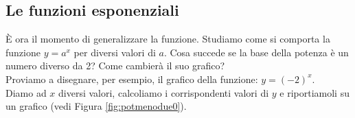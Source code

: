 \subsection{Le funzioni esponenziali}
\label{subsec:esplog_fesponenziale}

È ora il momento di generalizzare la funzione. 
Studiamo come si comporta la funzione \(y=a^x\) per diversi valori di \(a\).
Cosa succede se la base della potenza è un numero diverso da 2? 
Come cambierà il suo grafico?\\[10pt]
\; Proviamo a disegnare, per esempio, il grafico della 
funzione: \(y=(-2)^x\).\\[4pt]
Diamo ad \(x\) diversi valori, calcoliamo i corrispondenti valori di \(y\) 
e riportiamoli su un grafico (vedi Figura \ref{fig:potmenodue0}).

